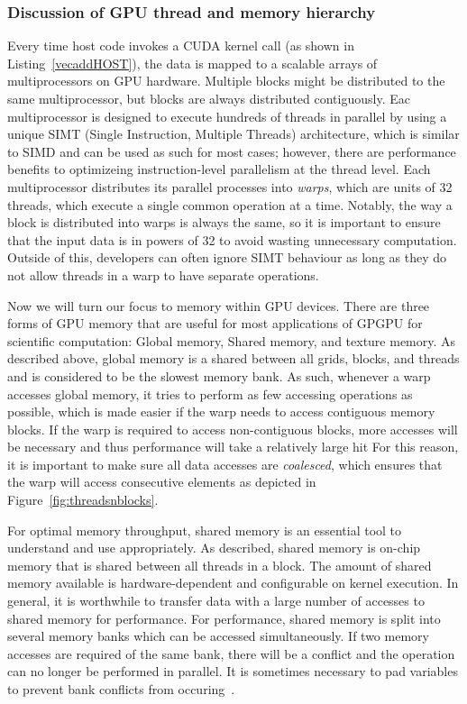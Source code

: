\subsubsection{Discussion of GPU thread and memory hierarchy}

Every time host code invokes a CUDA kernel call (as shown in Listing~\ref{vecaddHOST}), the data is mapped to a scalable arrays of multiprocessors on GPU hardware.
Multiple blocks might be distributed to the same multiprocessor, but blocks are always distributed contiguously.
Eac multiprocessor is designed to execute hundreds of threads in parallel by using a unique SIMT (Single Instruction, Multiple Threads) architecture, which is similar to SIMD and can be used as such for most cases; however, there are performance benefits to optimizeing instruction-level parallelism at the thread level.
Each multiprocessor distributes its parallel processes into \textit{warps}, which are units of 32 threads, which execute a single common operation at a time.
Notably, the way a block is distributed into warps is always the same, so it is important to ensure that the input data is in powers of 32 to avoid wasting unnecessary computation.
Outside of this, developers can often ignore SIMT behaviour as long as they do not allow threads in a warp to have separate operations.

Now we will turn our focus to memory within GPU devices.
There are three forms of GPU memory that are useful for most applications of GPGPU for scientific computation: Global memory, Shared memory, and texture memory.
As described above, global memory is a shared between all grids, blocks, and threads and is considered to be the slowest memory bank.
As such, whenever a warp accesses global memory, it tries to perform as few accessing operations as possible, which is made easier if the warp needs to access contiguous memory blocks.
If the warp is required to access non-contiguous blocks, more accesses will be necessary and thus performance will take a relatively large hit
For this reason, it is important to make sure all data accesses are \textit{coalesced}, which ensures that the warp will access consecutive elements as depicted in Figure~\ref{fig:threadsnblocks}.

For optimal memory throughput, shared memory is an essential tool to understand and use appropriately.
As described, shared memory is on-chip memory that is shared between all threads in a block.
The amount of shared memory available is hardware-dependent and configurable on kernel execution.
In general, it is worthwhile to transfer data with a large number of accesses to shared memory for performance.
For performance, shared memory is split into several memory banks which can be accessed simultaneously.
If two memory accesses are required of the same bank, there will be a conflict and the operation can no longer be performed in parallel.
It is sometimes necessary to pad variables to prevent bank conflicts from occuring~\cite{harris2013}.


